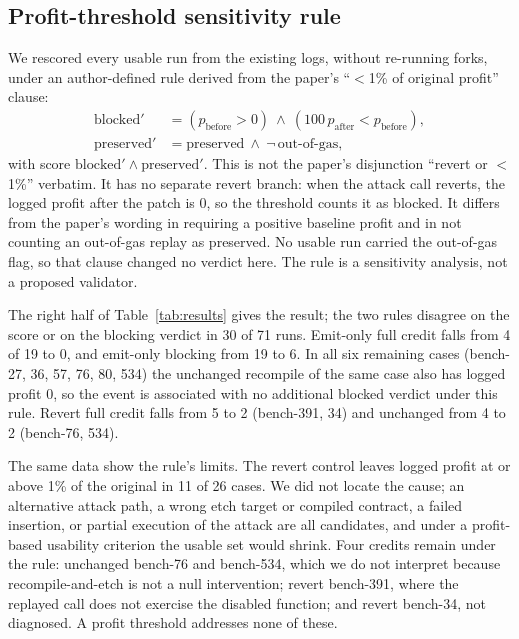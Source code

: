 \documentclass[conference]{IEEEtran}
\begin{document}
\subsection{Profit-threshold sensitivity rule}
We rescored every usable run from the existing logs, without re-running forks, under an author-defined rule derived from the paper's ``$<$1\% of original profit'' clause:
\begin{align*}
\text{blocked}' &= (p_{\text{before}}>0)\ \wedge\ (100\,p_{\text{after}}<p_{\text{before}}),\\
\text{preserved}' &= \text{preserved}\ \wedge\ \neg\,\text{out-of-gas},
\end{align*}
with score $\text{blocked}'\wedge\text{preserved}'$. This is not the paper's disjunction ``revert or $<$1\%'' verbatim. It has no separate revert branch: when the attack call reverts, the logged profit after the patch is 0, so the threshold counts it as blocked. It differs from the paper's wording in requiring a positive baseline profit and in not counting an out-of-gas replay as preserved. No usable run carried the out-of-gas flag, so that clause changed no verdict here. The rule is a sensitivity analysis, not a proposed validator.

The right half of Table~\ref{tab:results} gives the result; the two rules disagree on the score or on the blocking verdict in 30 of 71 runs. Emit-only full credit falls from 4 of 19 to 0, and emit-only blocking from 19 to 6. In all six remaining cases (bench-27, 36, 57, 76, 80, 534) the unchanged recompile of the same case also has logged profit 0, so the event is associated with no additional blocked verdict under this rule. Revert full credit falls from 5 to 2 (bench-391, 34) and unchanged from 4 to 2 (bench-76, 534).

The same data show the rule's limits. The revert control leaves logged profit at or above 1\% of the original in 11 of 26 cases. We did not locate the cause; an alternative attack path, a wrong etch target or compiled contract, a failed insertion, or partial execution of the attack are all candidates, and under a profit-based usability criterion the usable set would shrink. Four credits remain under the rule: unchanged bench-76 and bench-534, which we do not interpret because recompile-and-etch is not a null intervention; revert bench-391, where the replayed call does not exercise the disabled function; and revert bench-34, not diagnosed. A profit threshold addresses none of these.
\end{document}
